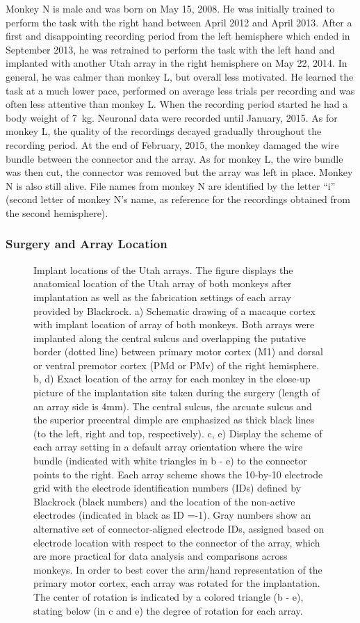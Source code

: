 {Monkey N is male and was born on May 15, 2008. He was initially trained to perform the task with the right hand between April 2012 and April 2013. After a first and disappointing recording period from the left hemisphere which ended in September 2013, he was retrained to perform the task with the left hand and implanted with another Utah array in the right hemisphere on May 22, 2014. In general, he was calmer than monkey L, but overall less motivated. He learned the task at a much lower pace, performed on average less trials per recording and was often less attentive than monkey L. When the recording period started he had a body weight of 7 kg. Neuronal data were recorded until January, 2015. As for monkey L, the quality of the recordings decayed gradually throughout the recording period. At the end of February, 2015, the monkey damaged the wire bundle between the connector and the array. As for monkey L, the wire bundle was then cut, the connector was removed but the array was left in place. Monkey N is also still alive. File names from monkey N are identified by the letter “i” (second letter of monkey N’s name, as reference for the recordings obtained from the second hemisphere). 

\subsubsection{Surgery and Array Location}

\begin{figure}
\caption[Implant locations of the Utah arrays]{Implant locations of the Utah arrays. The figure displays the anatomical location of the Utah array of both monkeys after implantation as well as the fabrication settings of each array provided by Blackrock. a) Schematic drawing of a macaque cortex with implant location of array of both monkeys. Both arrays were implanted along the central sulcus and overlapping the putative border (dotted line) between primary motor cortex (M1) and dorsal or ventral premotor cortex (PMd or PMv) of the right hemisphere. b, d) Exact location of the array for each monkey in the close-up picture of the implantation site taken during the surgery (length of an array side is 4mm). The central sulcus, the arcuate sulcus and the superior precentral dimple are emphasized as thick black lines (to the left, right and top, respectively). c, e) Display the scheme of each array setting in a default array orientation where the wire bundle (indicated with white triangles in b - e) to the connector points to the right. Each array scheme shows the 10-by-10 electrode grid with the electrode identification numbers (IDs) defined by Blackrock (black numbers) and the location of the non-active electrodes (indicated in black as ID =-1). Gray numbers show an alternative set of connector-aligned electrode IDs, assigned based on electrode location with respect to the connector of the array, which are more practical for data analysis and comparisons across monkeys. In order to best cover the arm/hand representation of the primary motor cortex, each array was rotated for the implantation. The center of rotation is indicated by a colored triangle (b - e), stating below (in c and e) the degree of rotation for each array.}
\end{figure}


}
